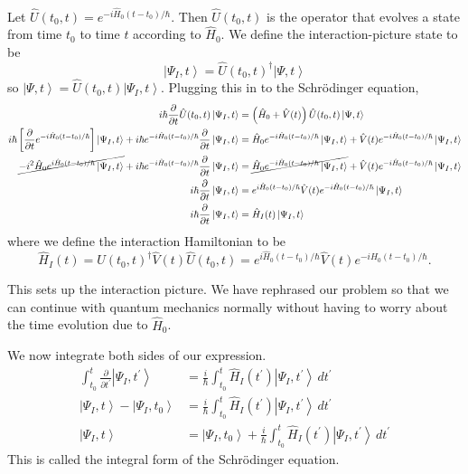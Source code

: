 \documentclass[11pt]{article}
\newcommand{\ket}[1]{\left|#1\right\rangle}
\newcommand{\op}[1]{\hat{#1}}
\theoremstyle{theorem}
\theoremstyle{remark}
\theoremstyle{step}
\theoremstyle{gap}
\begin{document}
Let \(\op{U}(t_0, t) = e^{-i\op{H}_0(t-t_0)/\hbar}\). Then \(\op{U}(t_0, t)\) is the operator that evolves a state from time \(t_0\) to time \(t\) according to \(\op{H}_0\). We define the interaction-picture state to be
\[\ket{\Psi_I, t} = \op{U}(t_0, t)^\dagger \ket{\Psi, t}\]
so \(\ket{\Psi, t} = \op{U}(t_0, t) \ket{\Psi_I, t}\).
Plugging this in to the Schr\"odinger equation,
\begin{align*}
i \hbar \frac{\partial}{\partial t} \op{U}(t_0, t)\ket{\Psi_I, t} &= \left(\op{H}_0 + \op{V}(t)\right) \op{U}(t_0, t)\ket{\Psi, t} \\
i \hbar \left[\frac{\partial}{\partial t} e^{-i\op{H}_0(t-t_0)/\hbar}\right] \ket{\Psi_I, t} + i \hbar e^{-i\op{H}_0(t-t_0)/\hbar} \frac{\partial}{\partial t} \ket{\Psi_I, t} &= \op{H}_0 e^{-i\op{H}_0(t-t_0)/\hbar}\ket{\Psi_I, t} + \op{V}(t) e^{-i\op{H}_0(t-t_0)/\hbar}\ket{\Psi_I, t} \\
\cancel{-i^2 \op{H}_0 e^{i\op{H}_0(t-t_0)/\hbar} \ket{\Psi_I, t}} + i \hbar e^{-i\op{H}_0(t-t_0)/\hbar} \frac{\partial}{\partial t} \ket{\Psi_I, t} &= \cancel{\op{H}_0 e^{-i\op{H}_0(t-t_0)/\hbar}\ket{\Psi_I, t}} + \op{V}(t) e^{-i\op{H}_0(t-t_0)/\hbar}\ket{\Psi_I, t} \\
 i \hbar \frac{\partial}{\partial t} \ket{\Psi_I, t} &= e^{i\op{H}_0(t-t_0)/\hbar}\op{V}(t) e^{-i\op{H}_0(t-t_0)/\hbar}\ket{\Psi_I, t} \\
 i \hbar \frac{\partial}{\partial t} \ket{\Psi_I, t} &= \op{H}_I(t)\ket{\Psi_I, t}
\end{align*}
where we define the interaction Hamiltonian to be
\[\op{H}_I(t) = \op{U}(t_0, t)^\dagger \op{V}(t)\op{U}(t_0, t) = e^{i\op{H}_0(t-t_0)/\hbar}\op{V}(t) e^{-i\op{H}_0(t-t_0)/\hbar}.\]

This sets up the interaction picture. We have rephrased our problem so that we can continue with quantum mechanics normally without having to worry about the time evolution due to \(\op{H}_0\).

We now integrate both sides of our expression.
\begin{align}
\int_{t_0}^t \frac{\partial}{\partial t^\prime} \ket{\Psi_I, t^\prime} &= \frac{i}{\hbar} \int_{t_0}^t \op{H}_I(t^\prime)\ket{\Psi_I, t^\prime} \,dt^\prime \nonumber\\
\ket{\Psi_I, t} - \ket{\Psi_I, t_0} &= \frac{i}{\hbar} \int_{t_0}^t \op{H}_I(t^\prime)\ket{\Psi_I, t^\prime} \,dt^\prime \nonumber\\
\ket{\Psi_I, t} &= \ket{\Psi_I, t_0} + \frac{i}{\hbar} \int_{t_0}^t \op{H}_I(t^\prime)\ket{\Psi_I, t^\prime} \,dt^\prime \label{eq.intse}
\end{align}
This is called the integral form of the Schr\"odinger equation.
\end{document}
